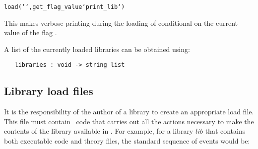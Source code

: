 \begin{hol}
\begin{alltt}
   load(``, get_flag_value `print_lib`)
\end{alltt}\end{hol}

\noindent This makes verbose printing during the loading of 
conditional on the current value of the flag .

A list of the currently loaded libraries can be obtained using:

\begin{boxed}
\begin{verbatim}
   libraries : void -> string list
\end{verbatim}\end{boxed}

\subsection{Library load files}


It is the responsibility of the author of a library to create an appropriate
load file. This file must contain \ML\ code that carries out all the actions
necessary to make the contents of the library available in \HOL. For example,
for a library $lib$ that contains both executable code and theory files, the
standard sequence of events would be:

